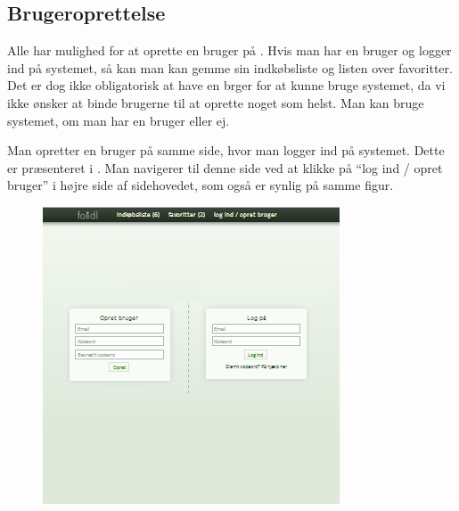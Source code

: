 \subsection{Brugeroprettelse}
\label{subsec:brug-opret}

Alle har mulighed for at oprette en bruger på \Foodl{}. Hvis man har en bruger og logger ind på systemet, så kan man kan gemme sin indkøbsliste og listen over favoritter. Det er dog ikke obligatorisk at have en brger for at kunne bruge systemet, da vi ikke ønsker at binde brugerne til at oprette noget som helst. Man kan bruge systemet, om man har en bruger eller ej. 

Man opretter en bruger på samme side, hvor man logger ind på systemet. Dette er præsenteret i . Man navigerer til denne side ved at klikke på ``log ind / opret bruger'' i højre side af sidehovedet, som også er synlig på samme figur.

\begin{figure}[H]
	\centering
	\includegraphics[scale=1]{billeder/foodl/thumbnails/opretbrugeroglogind.png}
	\label{fig:overblik-brugeroprettelse}
\end{figure}




